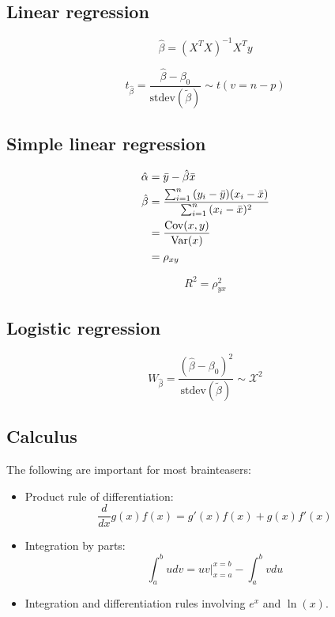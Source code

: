 \documentclass[a4paper]{article}
\begin{document}
\begin{multicols}{2}
\subsection*{Linear regression}
\[
    \hat{\beta} = (X^T X)^{-1}X^T y
\]

\[
t_{\hat\beta}  =  \frac{\hat\beta - \beta_0}{ \text{stdev}( \tilde\beta) } \sim t(v=n-p)
\]

\subsection*{Simple linear regression}
\begin{align*}
  \hat{\alpha} &= \bar{y} - \hat\beta \bar{x}  \\
  \hat{\beta} &=
  \frac
  {\sum_{i=1}^{n}{ (y_i - \bar{y}) (x_i - \bar{x}) }}
  {\sum_{i=1}^{n}{ (x_i - \bar{x})^2 }}  \\
  &=
  \frac
  {\operatorname{\mathrm{Cov}}(x, y)}
  {\operatorname{\mathrm{Var}}(x)} \\
  &= \rho_{xy}
\end{align*}

\[
  R^2 = \rho_{yx}^2
\]

\subsection*{Logistic regression}
\[
W_{\hat\beta}
=  \frac{(\hat\beta - \beta_0)^2}{ \text{stdev}( \tilde\beta) }
\sim \mathcal{X}^2
\]


\subsection*{Calculus}
The following are important for most brainteasers:
\begin{itemize}
  \item
Product rule of differentiation:
\[
  \frac{d}{dx}
  g(x)f(x) =
  g'(x)f(x) +
  g(x)f'(x)
\]

  \item
Integration by parts:
\[
\int_{a}^{b}{ u dv }
=
uv\Big\vert_{x=a}^{x=b} - \int_{a}^{b}{ v du }
\]
  \item
Integration and differentiation rules involving $e^{x}$ and $\ln(x)$.
\end{itemize}


\end{multicols}
\clearpage




{}


%


{}
\printindex
\end{document}
